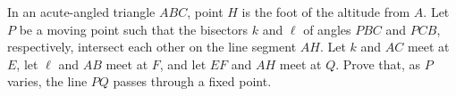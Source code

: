 In an acute-angled triangle $ABC$, point $H$ is the foot of the altitude from $A$. Let $P$ be a moving point such that the bisectors $k$ and $\ell$ of angles $PBC$ and $PCB$, respectively, intersect each other on the line segment $AH$. Let $k$ and $AC$ meet at $E$, let $\ell$ and $AB$ meet at $F$, and let $EF$ and $AH$ meet at $Q$. Prove that, as $P$ varies, the line $PQ$ passes through a fixed point.

